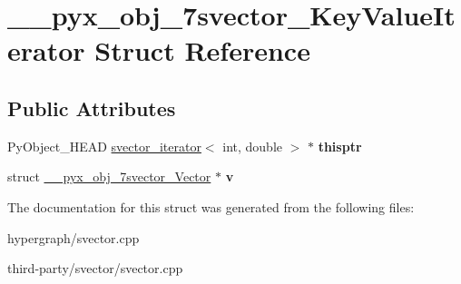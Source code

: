 \hypertarget{struct____pyx__obj__7svector__KeyValueIterator}{
\section{\_\-\_\-pyx\_\-obj\_\-7svector\_\-KeyValueIterator Struct Reference}
\label{struct____pyx__obj__7svector__KeyValueIterator}
}
\subsection*{Public Attributes}
\begin{DoxyCompactItemize}
\item 
\hypertarget{struct____pyx__obj__7svector__KeyValueIterator_a18a0d0cb652073d34d4e2025e858c0c1}{
PyObject\_\-HEAD \hyperlink{structsvector__iterator}{svector\_\-iterator}$<$ int, double $>$ $\ast$ {\bfseries thisptr}}
\label{struct____pyx__obj__7svector__KeyValueIterator_a18a0d0cb652073d34d4e2025e858c0c1}

\item 
\hypertarget{struct____pyx__obj__7svector__KeyValueIterator_a4886fcd2aaaecde593025b1d4490ea4e}{
struct \hyperlink{struct____pyx__obj__7svector__Vector}{\_\-\_\-pyx\_\-obj\_\-7svector\_\-Vector} $\ast$ {\bfseries v}}
\label{struct____pyx__obj__7svector__KeyValueIterator_a4886fcd2aaaecde593025b1d4490ea4e}

\end{DoxyCompactItemize}


The documentation for this struct was generated from the following files:\begin{DoxyCompactItemize}
\item 
hypergraph/svector.cpp\item 
third-\/party/svector/svector.cpp\end{DoxyCompactItemize}

